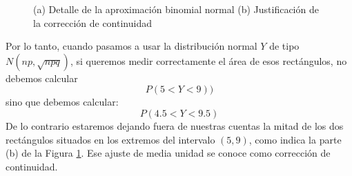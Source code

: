 \begin{figure}[p]
\begin{center}
\begin{bn}
\end{bn}
\caption{(a) Detalle de la aproximación binomial normal (b) Justificación de la corrección de continuidad}
\label{cap05:fig:correccioncontinuidad}
\end{center}
\end{figure}

Por lo tanto, cuando pasamos a usar la distribución normal $Y$ de tipo $N(np,\sqrt{npq})$, si queremos medir correctamente el área de esos rectángulos, no debemos calcular
\[P(5<Y<9))\]
sino que debemos calcular:
\[P(4.5<Y<9.5)\]
De lo contrario estaremos dejando fuera de nuestras cuentas la mitad de los dos rectángulos situados en los extremos del intervalo $(5,9)$, como indica la parte (b) de la Figura \ref{cap05:fig:correccioncontinuidad}. Ese ajuste de media unidad se conoce como {\sf corrección de continuidad}.


